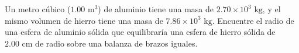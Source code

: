 \item Un metro cúbico ($1.00 \text{ m}^3$) de aluminio tiene una masa de $2.70 \times 10^3 \text{ kg}$, y el mismo volumen de hierro tiene una masa de $7.86 \times 10^3 \text{ kg}$. Encuentre el radio de una esfera de aluminio sólida que equilibraría una esfera de hierro sólida de $2.00 \text{ cm}$ de radio sobre una balanza de brazos iguales.
